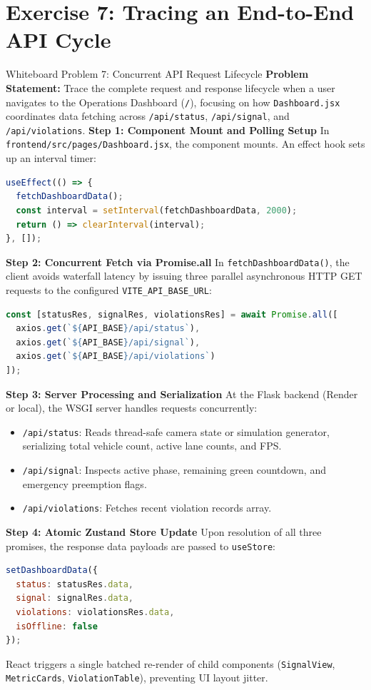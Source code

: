 \section{Exercise 7: Tracing an End-to-End API Cycle}
\label{sec:wb_tracing}

\begin{interviewq}{Whiteboard Problem 7: Concurrent API Request Lifecycle}
\textbf{Problem Statement:}
Trace the complete request and response lifecycle when a user navigates to the Operations Dashboard (\texttt{/}), focusing on how \texttt{Dashboard.jsx} coordinates data fetching across \texttt{/api/status}, \texttt{/api/signal}, and \texttt{/api/violations}.
\tcblower
\textbf{Step 1: Component Mount and Polling Setup}
In \texttt{frontend/src/pages/Dashboard.jsx}, the component mounts. An effect hook sets up an interval timer:
\begin{lstlisting}[language=JavaScript]
useEffect(() => {
  fetchDashboardData();
  const interval = setInterval(fetchDashboardData, 2000);
  return () => clearInterval(interval);
}, []);
\end{lstlisting}

\textbf{Step 2: Concurrent Fetch via Promise.all}
In \texttt{fetchDashboardData()}, the client avoids waterfall latency by issuing three parallel asynchronous HTTP GET requests to the configured \texttt{VITE\_API\_BASE\_URL}:
\begin{lstlisting}[language=JavaScript]
const [statusRes, signalRes, violationsRes] = await Promise.all([
  axios.get(`${API_BASE}/api/status`),
  axios.get(`${API_BASE}/api/signal`),
  axios.get(`${API_BASE}/api/violations`)
]);
\end{lstlisting}

\textbf{Step 3: Server Processing and Serialization}
At the Flask backend (Render or local), the WSGI server handles requests concurrently:
\begin{itemize}
    \item \texttt{/api/status}: Reads thread-safe camera state or simulation generator, serializing total vehicle count, active lane counts, and FPS.
    \item \texttt{/api/signal}: Inspects active phase, remaining green countdown, and emergency preemption flags.
    \item \texttt{/api/violations}: Fetches recent violation records array.
\end{itemize}

\textbf{Step 4: Atomic Zustand Store Update}
Upon resolution of all three promises, the response data payloads are passed to \texttt{useStore}:
\begin{lstlisting}[language=JavaScript]
setDashboardData({
  status: statusRes.data,
  signal: signalRes.data,
  violations: violationsRes.data,
  isOffline: false
});
\end{lstlisting}
React triggers a single batched re-render of child components (\texttt{SignalView}, \texttt{MetricCards}, \texttt{ViolationTable}), preventing UI layout jitter.
\end{interviewq}

